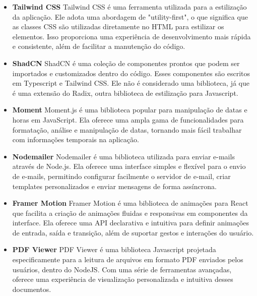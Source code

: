 \begin{itemize}
    \item \textbf{Tailwind CSS} \newline
Tailwind CSS é uma ferramenta utilizada para a estilização da aplicação. Ele adota uma abordagem de "utility-first", o que significa que as classes CSS são utilizadas diretamente no HTML para estilizar os elementos. Isso proporciona uma experiência de desenvolvimento mais rápida e consistente, além de facilitar a manutenção do código.

    \item \textbf{ShadCN} \newline
ShadCN é uma coleção de componentes prontos que podem ser importados e customizados dentro do código. Esses componentes são escritos em Typescript e Tailwind CSS. Ele não é considerado uma biblioteca, já que é uma extensão do Radix, outra biblioteca de estilização para Javascript.

    \item \textbf{Moment} \newline
Moment.js é uma biblioteca popular para manipulação de datas e horas em JavaScript. Ela oferece uma ampla gama de funcionalidades para formatação, análise e manipulação de datas, tornando mais fácil trabalhar com informações temporais na aplicação.

    \item \textbf{Nodemailer} \newline
Nodemailer é uma biblioteca utilizada para enviar e-mails através de Node.js. Ela oferece uma interface simples e flexível para o envio de e-mails, permitindo configurar facilmente o servidor de e-mail, criar templates personalizados e enviar mensagens de forma assíncrona.

    \item \textbf{Framer Motion} \newline
Framer Motion é uma biblioteca de animações para React que facilita a criação de animações fluidas e responsivas em componentes da interface. Ela oferece uma API declarativa e intuitiva para definir animações de entrada, saída e transição, além de suportar gestos e interações do usuário.

    \item \textbf{PDF Viewer} \newline
PDF Viewer é uma biblioteca Javascript projetada especificamente para a leitura de arquivos em formato PDF enviados pelos usuários, dentro do NodeJS. Com uma série de ferramentas avançadas, oferece uma experiência de visualização personalizada e intuitiva desses documentos.


\end{itemize}
